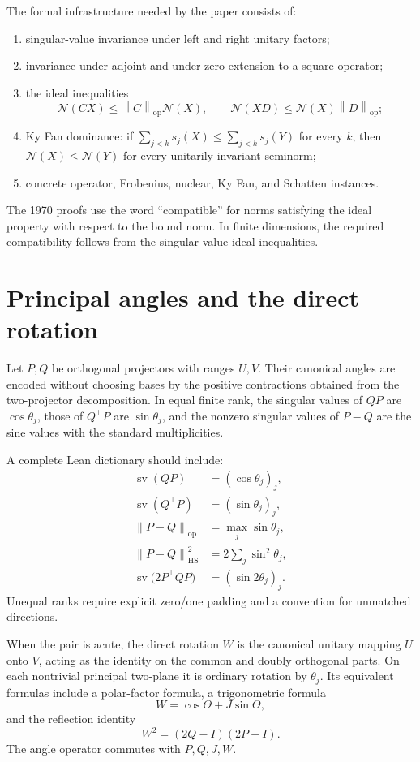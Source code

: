 \documentclass[11pt]{article}
\newcommand{\Nn}{\mathcal N}
\newcommand{\sv}{\operatorname{sv}}
\newcommand{\op}{\mathrm{op}}
\newcommand{\HS}{\mathrm{HS}}
\newcommand{\norm}[1]{\left\lVert#1\right\rVert}
\theoremstyle{remark}
\begin{document}
The formal infrastructure needed by the paper consists of:
\begin{enumerate}
\item singular-value invariance under left and right unitary factors;
\item invariance under adjoint and under zero extension to a square operator;
\item the ideal inequalities
\[
  \Nn(CX)\le \norm{C}_{\op}\Nn(X),\qquad
  \Nn(XD)\le \Nn(X)\norm{D}_{\op};
\]
\item Ky Fan dominance: if
\(\sum_{j<k}s_j(X)\le\sum_{j<k}s_j(Y)\) for every \(k\), then
\(\Nn(X)\le\Nn(Y)\) for every unitarily invariant seminorm;
\item concrete operator, Frobenius, nuclear, Ky Fan, and Schatten instances.
\end{enumerate}

The 1970 proofs use the word ``compatible'' for norms satisfying the ideal
property with respect to the bound norm.  In finite dimensions, the required
compatibility follows from the singular-value ideal inequalities.

\section{Principal angles and the direct rotation}

Let \(P,Q\) be orthogonal projectors with ranges \(U,V\).  Their canonical
angles are encoded without choosing bases by the positive contractions obtained
from the two-projector decomposition.  In equal finite rank, the singular
values of \(QP\) are \(\cos\theta_j\), those of \(Q^\perp P\) are
\(\sin\theta_j\), and the nonzero singular values of \(P-Q\) are the sine
values with the standard multiplicities.

A complete Lean dictionary should include:
\begin{align*}
  \sv(QP)&=(\cos\theta_j)_j,\\
  \sv(Q^\perp P)&=(\sin\theta_j)_j,\\
  \norm{P-Q}_{\op}&=\max_j\sin\theta_j,\\
  \norm{P-Q}_{\HS}^2&=2\sum_j\sin^2\theta_j,\\
  \sv\bigl(2P^\perp QP\bigr)&=(\sin 2\theta_j)_j.
\end{align*}
Unequal ranks require explicit zero/one padding and a convention for unmatched
directions.

When the pair is acute, the direct rotation \(W\) is the canonical unitary
mapping \(U\) onto \(V\), acting as the identity on the common and doubly
orthogonal parts.  On each nontrivial principal two-plane it is ordinary
rotation by \(\theta_j\).  Its equivalent formulas include a polar-factor
formula, a trigonometric formula
\[
  W=\cos\Theta+J\sin\Theta,
\]
and the reflection identity
\[
  W^2=(2Q-I)(2P-I).
\]
The angle operator commutes with \(P,Q,J,W\).
\end{document}
